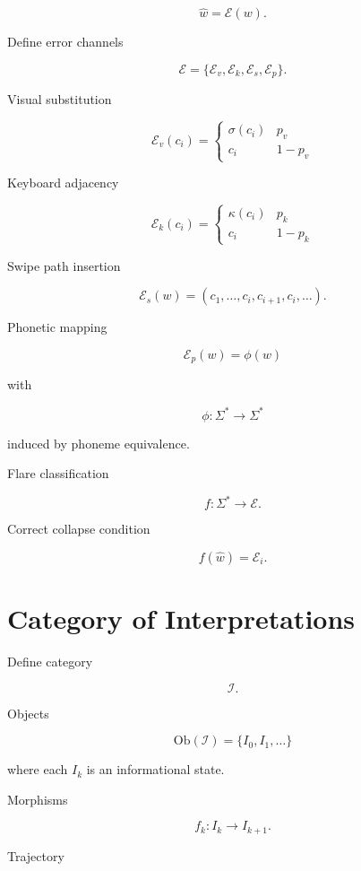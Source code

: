 \documentclass[11pt]{article}
\begin{document}
\[
\hat{w} = \mathcal{E}(w).
\]

Define error channels

\[
\mathcal{E} =
\{\mathcal{E}_v,\mathcal{E}_k,\mathcal{E}_s,\mathcal{E}_p\}.
\]

Visual substitution

\[
\mathcal{E}_v(c_i) =
\begin{cases}
\sigma(c_i) & p_v \\
c_i & 1-p_v
\end{cases}
\]

Keyboard adjacency

\[
\mathcal{E}_k(c_i) =
\begin{cases}
\kappa(c_i) & p_k \\
c_i & 1-p_k
\end{cases}
\]

Swipe path insertion

\[
\mathcal{E}_s(w) =
(c_1,\dots,c_i,c_{i+1},c_i,\dots).
\]

Phonetic mapping

\[
\mathcal{E}_p(w) = \phi(w)
\]

with

\[
\phi : \Sigma^* \to \Sigma^*
\]

induced by phoneme equivalence.

Flare classification

\[
f : \Sigma^* \to \mathcal{E}.
\]

Correct collapse condition

\[
f(\hat{w}) = \mathcal{E}_i.
\]


\section{Category of Interpretations}

Define category

\[
\mathcal{I}.
\]

Objects

\[
\text{Ob}(\mathcal{I}) =
\{I_0,I_1,\dots\}
\]

where each $I_k$ is an informational state.

Morphisms

\[
f_k : I_k \to I_{k+1}.
\]

Trajectory
\end{document}
